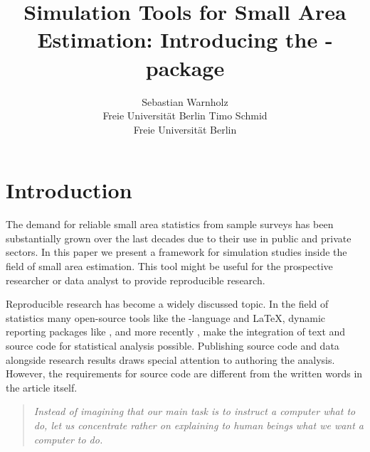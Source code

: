 \documentclass[article]{ajs}
\author{Sebastian Warnholz\\ Freie Universit\"at Berlin \And 
        Timo Schmid \\ Freie Universit\"at Berlin}
\title{Simulation Tools for Small Area Estimation: Introducing the \proglang{R}-package \proglang{saeSim}}
\begin{document}
%
%
%
\section{Introduction}
The demand for reliable small area statistics from sample surveys has been substantially grown over the last decades due to their use in public and private sectors. In this paper we present a framework for simulation studies inside the field of small area estimation. This tool might be useful for the prospective researcher or data analyst to provide reproducible research.

Reproducible research has become a widely discussed topic. In the field of statistics many open-source tools like the -language \citep{r14} and \LaTeX, dynamic reporting packages like  \citep{yihui13},  \citep{leisch02} and more recently  \citep{allaire14}, make the integration of text and source code for statistical analysis possible. Publishing source code and data alongside research results draws special attention to authoring the analysis. However, the requirements for source code are different from the written words in the article itself. 

\begin{quote}
\textit{Instead of imagining that our main task is to instruct a computer what to do, let us concentrate rather on explaining to human beings what we want a computer to do.} \cite[p.99]{knuth92} 
\end{quote} 
\end{document}
